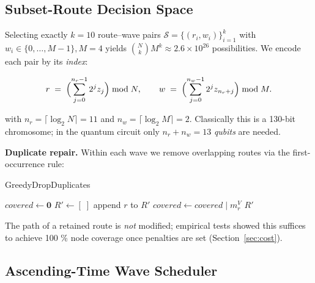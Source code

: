 \subsection{Subset-Route Decision Space}

Selecting exactly \(k=10\) route–wave pairs
\(\mathcal{S}=\{(r_i,w_i)\}_{i=1}^{k}\)
with \(w_i\in\{0,\dots,M-1\}, M=4\) yields
\(\binom{N}{k}M^{k}\!\approx\! 2.6\times10^{26}\) possibilities.
We encode each pair by its \emph{index}:

\begin{equation}
    \label{eq:logindex}
    r \;=\;
    \Bigl(\sum_{j=0}^{n_r-1}2^{j} z_j\Bigr)\bmod N,
    \qquad
    w \;=\;
    \Bigl(\sum_{j=0}^{n_w-1}2^{j} z_{n_r+j}\Bigr)\bmod M.
    \end{equation}
    

\noindent with \(n_r=\lceil\log_2 N\rceil=11\) and
\(n_w=\lceil\log_2 M\rceil=2\).
Classically this is a 130-bit chromosome; in the quantum circuit only
\(n_r+n_w=13\) \emph{qubits} are needed.

\vspace{2pt}\noindent
\textbf{Duplicate repair.}  
Within each wave we remove overlapping routes via the
first-occurrence rule:

\begin{algorithm}[H]
    \caption{GreedyDropDuplicates}
    \label{alg:dropdup}
    \begin{algorithmic}[1]
      \State $covered \gets \mathbf{0}$ 
      \State $R' \gets [\;]$
               \State append $r$ to $R'$
               \State $covered \gets covered \;|\; m^V_r$
           \EndIf
      \EndFor
      \State \Return $R'$
    \EndProcedure
\end{algorithmic}
\end{algorithm}
    

\noindent The path of a retained route is \emph{not} modified; empirical
tests showed this suffices to achieve 100 \% node coverage once
penalties are set (Section~\ref{sec:cost}).

\subsection{Ascending-Time Wave Scheduler}

